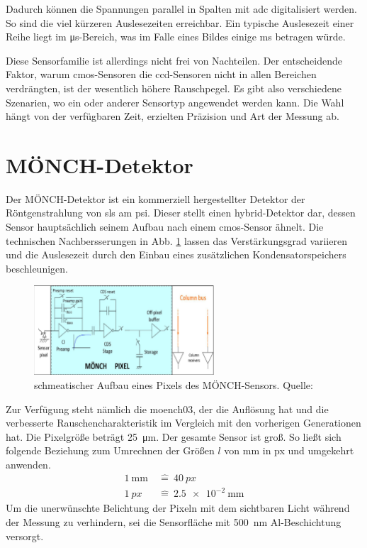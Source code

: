 \noindent
Dadurch können die Spannungen parallel in Spalten mit \gls{adc} digitalisiert werden. So sind die viel kürzeren Auslesezeiten erreichbar. Ein typische Auslesezeit einer Reihe liegt im \si{\micro\second}-Bereich, was im Falle eines  Bildes einige \si{\milli\second} betragen würde.

\noindent
Diese Sensorfamilie ist allerdings nicht frei von Nachteilen. Der entscheidende Faktor, warum \gls{cmos}-Sensoren die \gls{ccd}-Sensoren nicht in allen Bereichen verdrängten, ist der wesentlich höhere Rauschpegel. Es gibt also verschiedene Szenarien, wo ein oder anderer Sensortyp angewendet werden kann. Die Wahl hängt von der verfügbaren Zeit, erzielten Präzision und Art der Messung ab.

\section{MÖNCH-Detektor}
\label{text:moench_theorie}
Der MÖNCH-Detektor ist ein kommerziell hergestellter Detektor der Röntgenstrahlung von \gls{sls} am \gls{psi}. Dieser stellt einen hybrid-Detektor dar, dessen Sensor hauptsächlich seinem Aufbau nach einem \gls{cmos}-Sensor ähnelt. Die technischen Nachbersserungen in Abb. \ref{fig:moench_pixel} lassen das Verstärkungsgrad variieren und die Auslesezeit durch den Einbau eines zusätzlichen Kondensatorspeichers beschleunigen.
\begin{figure}[H]
    \centering
    \includegraphics[width=0.6\textwidth]{images/moench/paper_crop.png}
    \caption{schmeatischer Aufbau eines Pixels des MÖNCH-Sensors. Quelle: \cite{dinapoli_monch_2014}}
    \label{fig:moench_pixel}
\end{figure}
\noindent
Zur Verfügung steht nämlich die \gls{moench03}, der die Auflösung  hat und die verbesserte Rauschencharakteristik im Vergleich mit den vorherigen Generationen hat. Die Pixelgröße beträgt \SI{25}{\micro\meter}. Der gesamte Sensor ist  groß. So ließt sich folgende Beziehung zum Umrechnen der Größen $l$ von \si{\milli\meter} in px und umgekehrt anwenden.
\begin{equation}
    \begin{split}
\SI{1}{\milli\meter}\ &\widehat{=}\ \SI{40}{px}\\
\SI{1}{px}\ &\widehat{=}\ \SI{2.5e-2}{\milli\meter}
    \end{split}
    \label{eq:px_mm_ratio}
\end{equation}
\noindent
Um die unerwünschte Belichtung der Pixeln mit dem sichtbaren Licht während der Messung zu verhindern, sei die Sensorfläche mit \SI{500}{\nano\meter} Al-Beschichtung versorgt.


